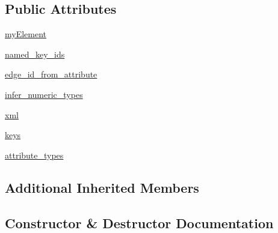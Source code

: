 \subsection*{Public Attributes}
\begin{DoxyCompactItemize}
\item 
\hyperlink{classnetworkx_1_1readwrite_1_1graphml_1_1GraphMLWriterLxml_ac5f9a06ea8e664f70f75114b3da0944b}{my\+Element}
\item 
\hyperlink{classnetworkx_1_1readwrite_1_1graphml_1_1GraphMLWriterLxml_a16d7a53f2b9545e47730500b82af311d}{named\+\_\+key\+\_\+ids}
\item 
\hyperlink{classnetworkx_1_1readwrite_1_1graphml_1_1GraphMLWriterLxml_ab1b90213dc2a5935a7f8e00cae76c50d}{edge\+\_\+id\+\_\+from\+\_\+attribute}
\item 
\hyperlink{classnetworkx_1_1readwrite_1_1graphml_1_1GraphMLWriterLxml_a6aa937555aad8dd7b98c9c3e7ccc2021}{infer\+\_\+numeric\+\_\+types}
\item 
\hyperlink{classnetworkx_1_1readwrite_1_1graphml_1_1GraphMLWriterLxml_aff3423ba9f8ba5f9f5f882147675d726}{xml}
\item 
\hyperlink{classnetworkx_1_1readwrite_1_1graphml_1_1GraphMLWriterLxml_af368c51690f7903718a7608f8010b3a9}{keys}
\item 
\hyperlink{classnetworkx_1_1readwrite_1_1graphml_1_1GraphMLWriterLxml_adfb2f9b0302dff583a9250dfc1592d6e}{attribute\+\_\+types}
\end{DoxyCompactItemize}
\subsection*{Additional Inherited Members}


\subsection{Constructor \& Destructor Documentation}
\mbox{\label{classnetworkx_1_1readwrite_1_1graphml_1_1GraphMLWriterLxml_a24a50f0eb2ea208ef8534675260cb267}} 

